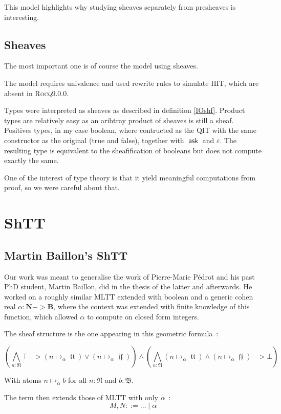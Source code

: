 \documentclass[11pt]{article}
\DeclareMathOperator{\ask}{\mathsf{ask}}
\DeclareMathOperator{\mtrue}{\mathfrak{tt}}
\DeclareMathOperator{\mfalse}{\mathfrak{ff}}
\newcommand{\0}{\mathbf{0}}
\newcommand{\1}{\mathbf{1}}
\newcommand{\nat}{\mathbf{N}}
\newcommand{\mnat}{\mathfrak{N}}
\newcommand{\bool}{\mathbf{B}}
\newcommand{\mbool}{\mathfrak{B}}
\newcommand{\rocq}{\textsc{Rocq}}
\begin{document}
This model highlights why studying sheaves separately from presheaves is interesting.

\subsection{Sheaves}

The most important one is of course the model using sheaves.

The model requires univalence and used rewrite rules to simulate HIT, which are absent in \rocq 9.0.0.

Types were interpreted as sheaves as described in definition \ref{IOshf}. Product types are relatively easy as an aribtray product of sheaves is still a sheaf. Positives types, in my case boolean, where contructed as the QIT with the same constructor as the original (true and false), together with $\ask$ and $\varepsilon$. The resulting type is equivalent to the sheafification of booleans but does not compute exactly the same.

One of the interest of type theory is that it yield meaningful computations from proof, so we were careful about that.

\section{ShTT}\label{ShTT}
\subsection{Martin Baillon's ShTT}\label{MBshtt}
Our work was meant to generalise the work of Pierre-Marie Pédrot and his past PhD student, Martin Baillon, did in the thesis of the latter \cite{baillon:tel-04617881} and afterwards. He worked on a roughly similar MLTT extended with boolean and a generic cohen real $\alpha: \nat -> \bool$, where the context was extended with finite knowledge of this function, which allowed $\alpha$ to compute on closed form integers.

The sheaf structure is the one appearing in this geometric formula~:

$$ \left(\bigwedge_{n : \mnat} \top -> (n \mapsto_\alpha \mtrue) \vee (n \mapsto_\alpha \mfalse)\right) \wedge \left(\bigwedge_{n : \mnat} (n\mapsto_\alpha \mtrue) \wedge (n \mapsto_\alpha \mfalse) -> \bot \right)$$

With atoms $n \mapsto_\alpha b$ for all $n : \mnat$ and $b:\mbool$.


The term then extends those of MLTT with only $\alpha$~:
$$ M, N ::= \dots \mid \alpha$$
\end{document}
